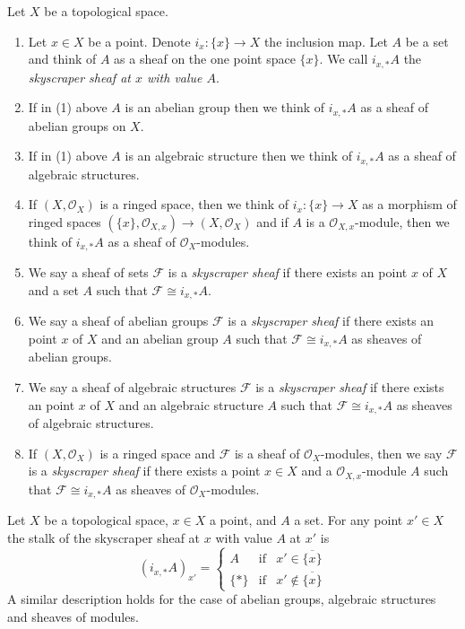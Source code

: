 \begin{definition}
\label{definition-skyscraper-sheaf}
Let $X$ be a topological space.
\begin{enumerate}
\item Let $x \in X$ be a point. Denote $i_x : \{x\} \to X$ the inclusion map.
Let $A$ be a set and think of $A$ as a sheaf on the one point space $\{x\}$.
We call $i_{x, *}A$ the {\it skyscraper sheaf at $x$ with value $A$}.
\item If in (1) above $A$ is an abelian group then we think of
$i_{x, *}A$ as a sheaf of abelian groups on $X$.
\item If in (1) above $A$ is an algebraic structure then we think
of $i_{x, *}A$ as a sheaf of algebraic structures.
\item If $(X, \mathcal{O}_X)$ is a ringed space, then we think
of $i_x : \{x\} \to X$ as a morphism of ringed spaces
$(\{x\}, \mathcal{O}_{X, x}) \to (X, \mathcal{O}_X)$
and if $A$ is a $\mathcal{O}_{X, x}$-module, then we think
of $i_{x, *}A$ as a sheaf of $\mathcal{O}_X$-modules.
\item We say a sheaf of sets $\mathcal{F}$ is a {\it skyscraper sheaf}
if there exists an point $x$ of $X$ and a set $A$ such
that $\mathcal{F} \cong i_{x, *}A$.
\item We say a sheaf of abelian groups $\mathcal{F}$ is a
{\it skyscraper sheaf} if there exists an point $x$ of $X$
and an abelian group $A$ such that $\mathcal{F} \cong i_{x, *}A$
as sheaves of abelian groups.
\item We say a sheaf of algebraic structures $\mathcal{F}$ is a
{\it skyscraper sheaf} if there exists an point $x$ of $X$
and an algebraic structure $A$ such that $\mathcal{F} \cong i_{x, *}A$
as sheaves of algebraic structures.
\item If $(X, \mathcal{O}_X)$ is a ringed space and
$\mathcal{F}$ is a sheaf of $\mathcal{O}_X$-modules, then
we say $\mathcal{F}$ is a {\it skyscraper sheaf} if there
exists a point $x \in X$ and a $\mathcal{O}_{X, x}$-module
$A$ such that $\mathcal{F} \cong i_{x, *}A$
as sheaves of $\mathcal{O}_X$-modules.
\end{enumerate}
\end{definition}

\begin{lemma}
\label{lemma-skyscraper-stalks}
Let $X$ be a topological space, $x \in X$ a point, and
$A$ a set. For any point $x' \in X$ the stalk of the
skyscraper sheaf at $x$ with value $A$ at $x'$ is
$$
(i_{x, *}A)_{x'} =
\left\{
\begin{matrix}
A & \text{if} & x' \in \overline{\{x\}} \\
\{*\} & \text{if} & x' \not\in \overline{\{x\}}
\end{matrix}
\right.
$$
A similar description holds for the case of
abelian groups, algebraic structures and
sheaves of modules.
\end{lemma}

